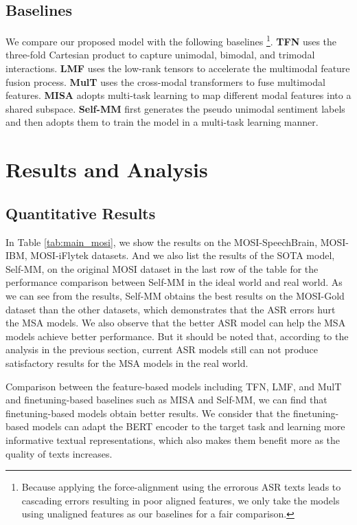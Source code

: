 \documentclass[11pt]{article}
\begin{document}
\subsection{Baselines}
We compare our proposed model with the following baselines \footnote{Because applying the force-alignment using the errorous ASR texts leads to cascading errors resulting in poor aligned features, we only take the models using unaligned features as our baselines for a fair comparison. }. \textbf{TFN}  \cite{zadeh-etal-2017-tensor} uses the three-fold Cartesian product to capture unimodal, bimodal, and trimodal interactions. \textbf{LMF}  \cite{liu-etal-2018-efficient} uses the low-rank tensors to accelerate the multimodal feature fusion process. \textbf{MulT} \cite{tsai-etal-2019-multimodal} uses the cross-modal transformers to fuse multimodal features. \textbf{MISA} \cite{10.1145/3394171.3413678} adopts multi-task learning to map different modal features into a shared subspace. \textbf{Self-MM} \cite{Yu_Xu_Yuan_Wu_2021} first generates the pseudo unimodal sentiment labels and then adopts them to train the model in a multi-task learning manner.



\section{Results and Analysis}
\subsection{Quantitative Results}
In Table \ref{tab:main_mosi}, we show the results on the MOSI-SpeechBrain, MOSI-IBM, MOSI-iFlytek datasets. And we also list the results of the SOTA model, Self-MM, on the original MOSI dataset in the last row of the table for the performance comparison between Self-MM in the ideal world and real world. As we can see from the results, Self-MM obtains the best results on the MOSI-Gold dataset than the other datasets, which demonstrates that the ASR errors hurt the MSA models. We also observe that the better ASR model can help the MSA models achieve better performance. But it should be noted that, according to the analysis in the previous section, current ASR models still can not produce satisfactory results for the MSA models in the real world. 

Comparison between the feature-based models including TFN, LMF, and MulT and finetuning-based baselines such as MISA and Self-MM, we can find that finetuning-based models obtain better results. We consider that the finetuning-based models can adapt the BERT encoder to the target task and learning more informative textual representations, which also makes them benefit more as the quality of texts increases. 
\end{document}
